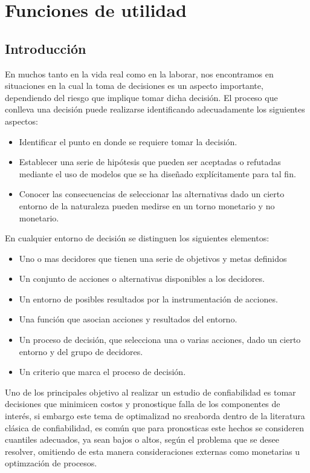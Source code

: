 \documentclass[letterpaper, titlepage,openright, twoside,11pt]{book}
\begin{document}
\chapter{Funciones de utilidad}

\section{Introducci\'on}

En muchos  tanto en la vida real como en la laborar, nos encontramos en situaciones en la cual la toma de decisiones es un aspecto importante, dependiendo del riesgo que implique tomar dicha decisi\'on. El proceso que conlleva una decisi\'on puede realizarse identificando adecuadamente los siguientes aspectos:

\begin{itemize}
\item Identificar el punto en donde se requiere tomar la decisi\'on.
\item Establecer una serie de hip\'otesis que pueden ser aceptadas o refutadas mediante el uso de modelos que se ha dise\~nado expl\'icitamente para tal fin.
\item Conocer las consecuencias de seleccionar las alternativas dado un cierto entorno de la naturaleza pueden medirse en un torno monetario y no monetario.
\end{itemize}


En cualquier entorno de decisi\'on se distinguen los siguientes elementos:


\begin{itemize}
\item Uno o mas decidores que tienen una serie de objetivos y metas definidos
\item Un conjunto de acciones o alternativas disponibles a los decidores.
\item Un entorno de posibles resultados por la instrumentaci\'on de acciones.
\item Una funci\'on que asocian acciones y resultados del entorno.
\item Un proceso de decisi\'on, que selecciona una o varias acciones, dado un cierto entorno y del grupo de decidores.
\item Un criterio que marca el proceso de decisi\'on.

\end{itemize}
Uno de los principales objetivo al realizar un estudio de confiabilidad es tomar decisiones que minimicen costos y pronostique falla de los componentes de inter\'es, si embargo este tema de optimalizad no sreaborda dentro de la literatura cl\'asica de confiabilidad, es com\'un que para pronosticas este hechos se consideren cuantiles adecuados, ya sean bajos o altos, seg\'un el problema que se desee resolver, omitiendo de esta manera consideraciones externas como monetarias u optimzaci\'on de procesos.
\end{document}
